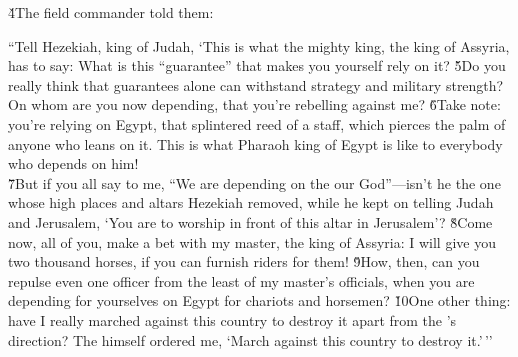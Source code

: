 \v{4}The field commander told them:

\begin{poetry}
\poeml ``Tell Hezekiah, king of Judah, `This is what the mighty king, the king of Assyria, has to say: What is this ``guarantee'' that makes you yourself rely on it? \v{5}Do you really think that guarantees alone can withstand strategy and military strength? On whom are you now depending, that you're rebelling against me? \v{6}Take note: you're relying on Egypt, that splintered reed of a staff, which pierces the palm of anyone who leans on it. This is what Pharaoh king of Egypt is like to everybody who depends on him! \\
\poeml \v{7}But if you all say to me, ``We are depending on the  our God''---isn't he the one whose high places and altars Hezekiah removed, while he kept on telling Judah and Jerusalem, `You are to worship in front of this altar in Jerusalem'? \v{8}Come now, all of you, make a bet with my master, the king of Assyria: I will give you two thousand horses, if you can furnish riders for them! \v{9}How, then, can you repulse even one officer from the least of my master's officials, when you are depending for yourselves on Egypt for chariots and horsemen? \v{10}One other thing: have I really marched against this country to destroy it apart from the 's direction? The  himself ordered me, `March against this country to destroy it.'\,''
\end{poetry}

